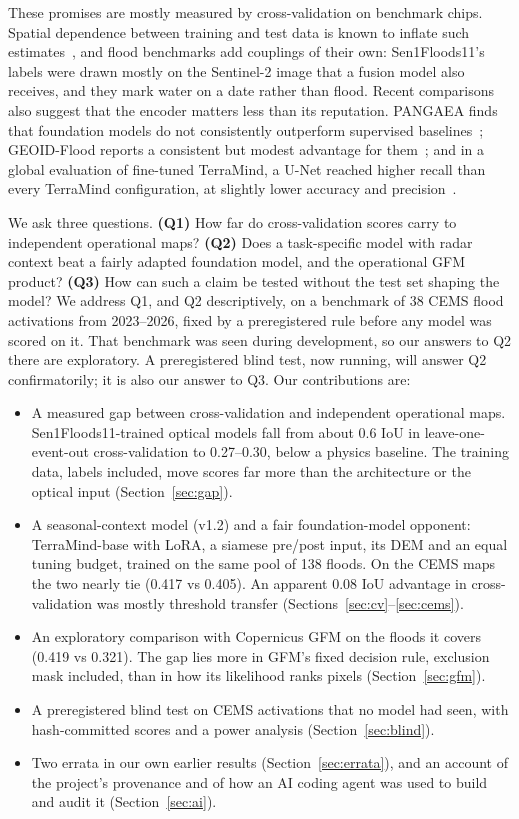 \documentclass[10pt,twocolumn,a4paper]{article}
\begin{document}
These promises are mostly measured by cross-validation on benchmark chips. Spatial dependence between training and
test data is known to inflate such estimates~\citep{roberts2017cv,ploton2020spatial,meyer2022maps}, and flood
benchmarks add couplings of their own: Sen1Floods11's labels were drawn mostly on the Sentinel-2 image that a fusion
model also receives, and they mark water on a date rather than flood. Recent comparisons also suggest that the encoder
matters less than its reputation. PANGAEA finds that foundation models do not consistently outperform supervised
baselines~\citep{marsocci2024pangaea}; GEOID-Flood reports a consistent but modest advantage for
them~\citep{chiriaco2026geoid}; and in a global evaluation of fine-tuned TerraMind, a U-Net reached higher recall
than every TerraMind configuration, at slightly lower accuracy and precision~\citep{tulbure2025floodsnet}.

We ask three questions. \textbf{(Q1)} How far do cross-validation scores carry to independent operational maps?
\textbf{(Q2)} Does a task-specific model with radar context beat a fairly adapted foundation model, and the operational
GFM product? \textbf{(Q3)} How can such a claim be tested without the test set shaping the model? We address Q1, and
Q2 descriptively, on a benchmark of 38 CEMS flood activations from 2023--2026, fixed by a preregistered rule before
any model was scored on it. That benchmark was seen during development, so our answers to Q2 there are exploratory.
A preregistered blind test, now running, will answer Q2 confirmatorily; it is also our answer to Q3. Our
contributions are:
\begin{itemize}
  \item A measured gap between cross-validation and independent operational maps. Sen1Floods11-trained optical models
    fall from about 0.6 IoU in leave-one-event-out cross-validation to 0.27--0.30, below a physics baseline. The
    training data, labels included, move scores far more than the architecture or the optical input
    (Section~\ref{sec:gap}).
  \item A seasonal-context model (v1.2) and a fair foundation-model opponent: TerraMind-base with LoRA, a siamese
    pre/post input, its DEM and an equal tuning budget, trained on the same pool of 138 floods. On the CEMS maps the two
    nearly tie (0.417 vs 0.405). An apparent 0.08 IoU advantage in cross-validation was mostly threshold transfer
    (Sections~\ref{sec:cv}--\ref{sec:cems}).
  \item An exploratory comparison with Copernicus GFM on the floods it covers (0.419 vs 0.321). The gap lies more in
    GFM's fixed decision rule, exclusion mask included, than in how its likelihood ranks pixels
    (Section~\ref{sec:gfm}).
  \item A preregistered blind test on CEMS activations that no model had seen, with hash-committed scores and a power
    analysis (Section~\ref{sec:blind}).
  \item Two errata in our own earlier results (Section~\ref{sec:errata}), and an account of the project's provenance
    and of how an AI coding agent was used to build and audit it (Section~\ref{sec:ai}).
\end{itemize}
\end{document}
